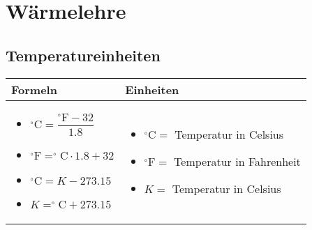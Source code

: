 \newpage
\section{Wärmelehre}

\subsection{Temperatureinheiten}				%
	\begin{tabular}{ | m{9cm} | m{9cm}  | }
		\hline
		Formeln & Einheiten \\ \hline
		\hline
		\begin{itemize}
			\item $^\circ\text{C}=\dfrac{^\circ\text{F}-32}{1.8}$
			\item $^\circ\text{F}=^\circ\text{C}\cdot 1.8+32$
			\item $^\circ\text{C}=K-273.15$
			\item $K=^\circ\text{C}+273.15$
			
		\end{itemize}
		&
		\begin{itemize}
			\item $^\circ\text{C}=$ Temperatur in Celsius
			\item $^\circ\text{F}=$ Temperatur in Fahrenheit
			\item $K=$ Temperatur in Celsius
		\end{itemize}
		\\ \hline
	\end{tabular}

